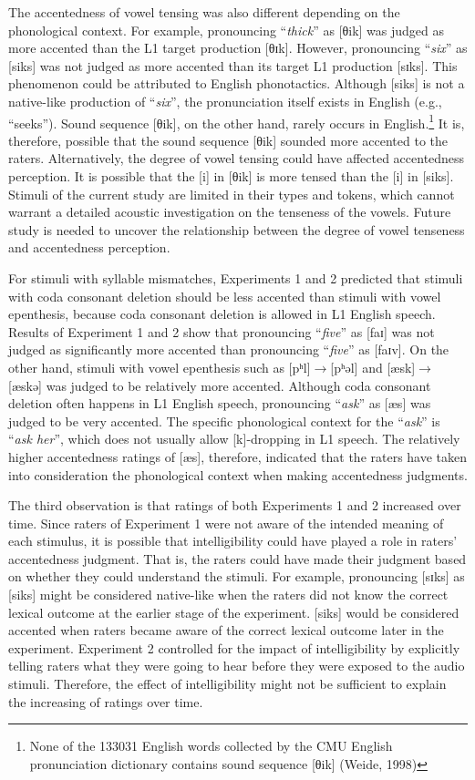 The accentedness of vowel tensing was also different depending on the phonological context. For example, pronouncing “\textit{thick}” as [θik] was judged as more accented than the L1 target production [θɪk]. However, pronouncing “\textit{six}” as [siks] was not judged as more accented than its target L1 production [sɪks]. This phenomenon could be attributed to English phonotactics. Although [siks] is not a native-like production of “\textit{six}”, the pronunciation itself exists in English (e.g., “seeks”). Sound sequence [θik], on the other hand, rarely occurs in English.\footnote{None of the 133031 English words collected by the CMU English pronunciation dictionary contains sound sequence [θik] (Weide, 1998)} It is, therefore, possible that the sound sequence [θik] sounded more accented to the raters. Alternatively, the degree of vowel tensing could have affected accentedness perception. It is possible that the [i] in [θik] is more tensed than the [i] in [siks]. Stimuli of the current study are limited in their types and tokens, which cannot warrant a detailed acoustic investigation on the tenseness of the vowels. Future study is needed to uncover the relationship between the degree of vowel tenseness and accentedness perception.

For stimuli with syllable mismatches, Experiments 1 and 2 predicted that stimuli with coda consonant deletion should be less accented than stimuli with vowel epenthesis, because coda consonant deletion is allowed in L1 English speech. Results of Experiment 1 and 2 show that pronouncing “\textit{five}” as [faɪ] was not judged as significantly more accented than pronouncing “\textit{five}” as [faɪv]. On the other hand, stimuli with vowel epenthesis such as [pʰl]$\rightarrow$[pʰəl] and [æsk]$\rightarrow$[æskə] was judged to be relatively more accented.  Although coda consonant deletion often happens in L1 English speech, pronouncing “\textit{ask}” as [æs] was judged to be very accented. The specific phonological context for the “\textit{ask}” is “\textit{ask her}”, which does not usually allow [k]-dropping in L1 speech. The relatively higher accentedness ratings of [æs], therefore, indicated that the raters have taken into consideration the phonological context when making accentedness judgments. 

The third observation is that ratings of both Experiments 1 and 2 increased over time. Since raters of  Experiment 1 were not aware of the intended meaning of each stimulus, it is possible that intelligibility could have played a role in raters’ accentedness judgment. That is, the raters could have made their judgment based on whether they could understand the stimuli. For example, pronouncing [sɪks] as [siks] might be considered native-like when the raters did not know the correct lexical outcome at the earlier stage of the experiment. [siks] would be considered accented when raters became aware of the correct lexical outcome later in the experiment. Experiment 2 controlled for the impact of intelligibility by explicitly telling raters what they were going to hear before they were exposed to the audio stimuli. Therefore, the effect of intelligibility might not be sufficient to explain the increasing of ratings over time.

